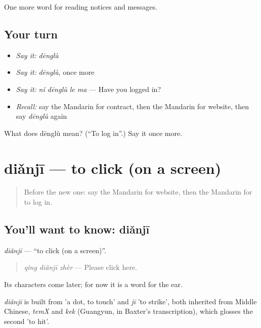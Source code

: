 \begin{grammarlens}[title={What you've built}]
One more word for reading notices and messages.
\end{grammarlens}

\subsection*{Your turn}
\begin{itemize}
\raggedright
  \item \emph{Say it:} \emph{dēnglù}
  \item \emph{Say it:} \emph{dēnglù}, once more
  \item \emph{Say it:} \emph{nǐ dēnglù le ma} — Have you logged in?
  \item \emph{Recall:} say the Mandarin for contract, then the Mandarin for website, then say \emph{dēnglù} again
\end{itemize}

\begin{tcolorbox}[breakable,colback=teal!4,colframe=teal!35!black,title={Before you move on}]
What does dēnglù mean? (\textquotedblleft{}To log in\textquotedblright{}.) Say it once more.
\end{tcolorbox}
\section[diǎnjī]{diǎnjī — to click (on a screen)}

\label{lesson:ZH-C204-dianji}



\begin{quote}
Before the new one: say the Mandarin for website, then the Mandarin for to log in.
\end{quote}

\subsection*{You'll want to know: diǎnjī}
\emph{diǎnjī} — \textquotedblleft{}to click (on a screen)\textquotedblright{}.

\begin{quote}
\emph{qǐng diǎnjī zhèr} — Please click here.
\end{quote}

Its characters come later; for now it is a word for the ear.

\begin{cousinweb}
\emph{diǎnjī} is built from  'a dot, to touch' and \emph{jī} 'to strike', both inherited from Middle Chinese, \emph{temX} and \emph{kek} (Guangyun, in Baxter's transcription), which glosses the second 'to hit'.
\end{cousinweb}

